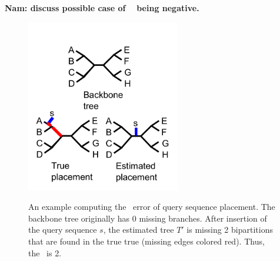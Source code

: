 \textbf{Nam: discuss possible case of \deltafn~ being negative.}

\begin{figure}[htbp]
\centering
{\includegraphics[width=0.60\textwidth]{background/unrooted_phylogeny_b}}
\caption[Computing \deltafn~error of query sequence placement.]{\label{back:placement_error}An example computing the \deltafn~error of query sequence placement.  The backbone tree originally has 0 missing branches.  After insertion of the query sequence $s$, the estimated tree $T'$ is missing 2 bipartitions that are found in the true true (missing edges colored red).  Thus, the \deltafn~is 2.}
\end{figure}



